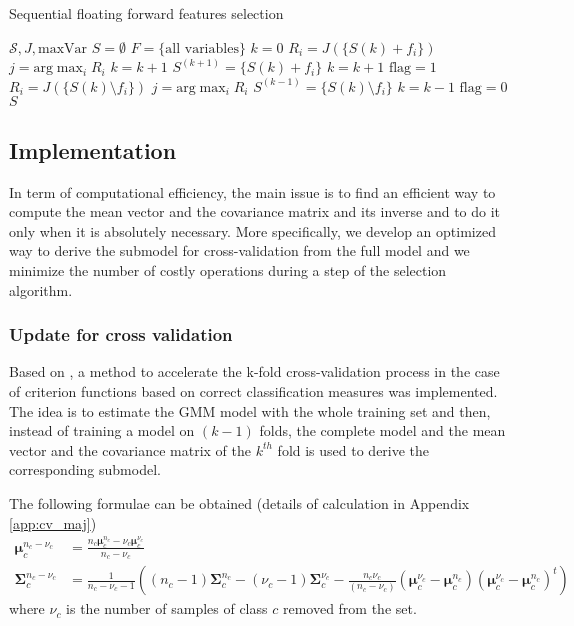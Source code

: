 \documentclass[a4paper,11pt,DIV=16]{scrartcl}
\begin{document}
    \begin{algorithm}
    \caption{Sequential floating forward features selection\label{alg:sffs}}
    \begin{algorithmic}[1]
    \REQUIRE $\mathcal{S},J,\text{maxVar}$
    \STATE $S=\emptyset$
    \STATE $F=\text{\{all variables\}}$
    \STATE $k=0$
    \STATE $R_i = J(\{S{(k)} + f_i\})$
    \ENDFOR
    \STATE $j=\text{arg} \max_{i} R_i$
    \STATE $k=k+1$
    \ELSE
    \STATE $S^{(k+1)} = \{S{(k)} + f_i\}$
    \STATE $k=k+1$
    \STATE $\text{flag}=1$
    \STATE $R_i = J(\{S{(k)}\setminus f_i\})$
    \ENDFOR
    \STATE $j=\text{arg} \max_{i} R_i$
    \STATE $S^{(k-1)} = \{S{(k)} \setminus f_i\}$
    \STATE $k=k-1$
    \ELSE
    \STATE $\text{flag}=0$
    \ENDIF
    \ENDWHILE
    \ENDIF
    \ENDWHILE
    \RETURN $S$
    \end{algorithmic}
    \end{algorithm}

    \subsection{Implementation}
    In term of computational efficiency, the main issue is to find an efficient way to compute the mean vector and the covariance matrix and its inverse and to do it only when it is absolutely necessary. More specifically, we develop an optimized way to derive the submodel for cross-validation from the full model and we minimize the number of costly operations during a step of the selection algorithm.

        \subsubsection{Update for cross validation}

        Based on \cite{fauvel2015fast}, a method to accelerate the k-fold cross-validation process in the case of criterion functions based on correct classification measures was implemented. The idea is to estimate the GMM model with the whole training set and then, instead of training a model on $(k-1)$ folds, the complete model and the mean vector and the covariance matrix of the $k^{th}$ fold is used to derive the corresponding submodel.

        The following formulae can be obtained (details of calculation in Appendix \ref{app:cv_maj})
        \begin{align}
            \boldsymbol{\mu}_c^{n_c-\nu_c} &= \frac{n_c \boldsymbol{\mu}_c^{n_c} - \nu_c \boldsymbol{\mu}_c^{\nu_c}}{n_c - \nu_c} \\
            \boldsymbol{\Sigma}_c^{n_c-\nu_c} &= \frac{1}{n_c-\nu_c-1} ( (n_c-1) \boldsymbol{\Sigma}_c^{n_c} - (\nu_c-1) \boldsymbol{\Sigma}_c^{\nu_c} - \frac{n_c \nu_c}{(n_c-\nu_c)} (\boldsymbol{\mu}_c^{\nu_c}-\boldsymbol{\mu}_c^{n_c})(\boldsymbol{\mu}_c^{\nu_c}-\boldsymbol{\mu}_c^{n_c})^t)
        \end{align}
        where $\nu_c$ is the number of samples of class $c$ removed from the set.
\end{document}
